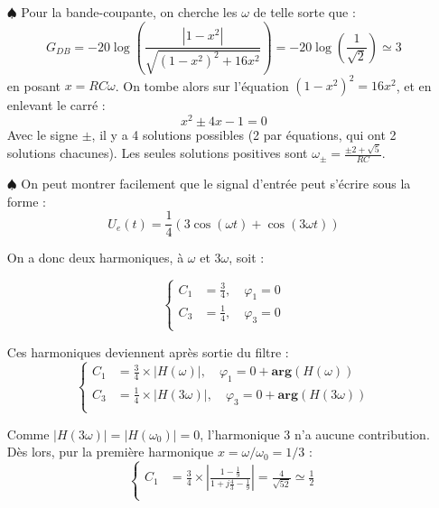 \documentclass{report}
\begin{document}
\begin{itemize}
	\item[$\spadesuit$] Pour la bande-coupante, on cherche les $\omega$ de telle sorte que :
\begin{equation}
	G_{DB} = -20\log \left( \frac{|1-x^2|}{\sqrt{(1-x^2)^2+16x^2}}\right) = -20\log\left(\frac{1}{\sqrt{2}} \right) \simeq 3
\end{equation}	
	en posant $x=RC\omega$.
On tombe alors sur l'équation $(1-x^2)^2=16x^2$, et en enlevant le carré :
\begin{equation}
	x^2\pm 4x -1 =0
\end{equation}
Avec le signe $\pm$, il y a 4 solutions possibles (2 par équations, qui ont 2 solutions chacunes). Les seules solutions positives sont $\omega_{\pm}=\frac{\pm 2+\sqrt{5}}{RC}$.

	\item[$\spadesuit$] On peut montrer facilement que le signal d'entrée peut s'écrire sous la forme :
	\begin{equation}
		U_e(t)=\frac{1}{4}\left( 3\cos(\omega t) + \cos(3\omega t)\right) 
	\end{equation}
	
	On a donc deux harmoniques, à $\omega$ et $3\omega$, soit :

\begin{equation}
	\left\lbrace
	\begin{array}{lll}
		C_1 & = \frac{3}{4}, \quad \varphi_1=0 \\

		C_3 & = \frac{1}{4}, \quad \varphi_3=0  \\
	\end{array}\right.
\end{equation}	

Ces harmoniques deviennent après sortie du filtre : 
\begin{equation}
	\left\lbrace
	\begin{array}{lll}
		C_1 & = \frac{3}{4}\times |H(\omega)|, \quad \varphi_1=0 + \mathbf{arg}\left(H(\omega) \right)  \\

		C_3 & = \frac{1}{4}\times |H(3\omega)|, \quad \varphi_3=0 + \mathbf{arg}\left(H(3\omega) \right)  \\
	\end{array}\right.
\end{equation}		

Comme $|H(3\omega)| = |H(\omega_0)| = 0$, l'harmonique 3 n'a aucune contribution. Dès lors, pur la première harmonique $x=\omega/\omega_0=1/3$ : 
\begin{equation}
	\left\lbrace
	\begin{array}{lll}
		C_1 & = \frac{3}{4}\times \left|\frac{1-\frac{1}{9}}{1+j\frac{4}{3}-\frac{1}{9}} \right| =\frac{4}{\sqrt{52}} \simeq\frac{1}{2} \\


\end{array}
\end{equation}
\end{itemize}
\end{document}
